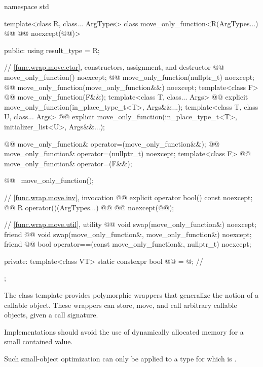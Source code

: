 %
\begin{codeblock}
namespace std {
  template<class R, class... ArgTypes>
  class move_only_function<R(ArgTypes...) @\cv{}@ @@ noexcept(@@)> {
  public:
    using result_type = R;

    // \ref{func.wrap.move.ctor}, constructors, assignment, and destructor
    @@ move_only_function() noexcept;
    @@ move_only_function(nullptr_t) noexcept;
    @@ move_only_function(move_only_function&&) noexcept;
    template<class F> @@ move_only_function(F&&);
    template<class T, class... Args>
      @@ explicit move_only_function(in_place_type_t<T>, Args&&...);
    template<class T, class U, class... Args>
      @@ explicit move_only_function(in_place_type_t<T>, initializer_list<U>, Args&&...);

    @@ move_only_function& operator=(move_only_function&&);
    @@ move_only_function& operator=(nullptr_t) noexcept;
    template<class F> @@ move_only_function& operator=(F&&);

    @@ ~move_only_function();

    // \ref{func.wrap.move.inv}, invocation
    @@ explicit operator bool() const noexcept;
    @@ R operator()(ArgTypes...) @\cv{}@ @@ noexcept(@@);

    // \ref{func.wrap.move.util}, utility
    @@ void swap(move_only_function&) noexcept;
    friend @@ void swap(move_only_function&, move_only_function&) noexcept;
    friend @@ bool operator==(const move_only_function&, nullptr_t) noexcept;

  private:
    template<class VT>
      static constexpr bool @@ = @\seebelow@;       // \expos
  };
}
\end{codeblock}

\pnum
The  class template provides polymorphic wrappers
that generalize the notion of a callable object.
These wrappers can store, move, and call arbitrary callable objects,
given a call signature.

\pnum
\recommended
Implementations should avoid the use of dynamically allocated memory
for a small contained value.
\begin{note}
Such small-object optimization can only be applied to a type 
for which  is .
\end{note}

